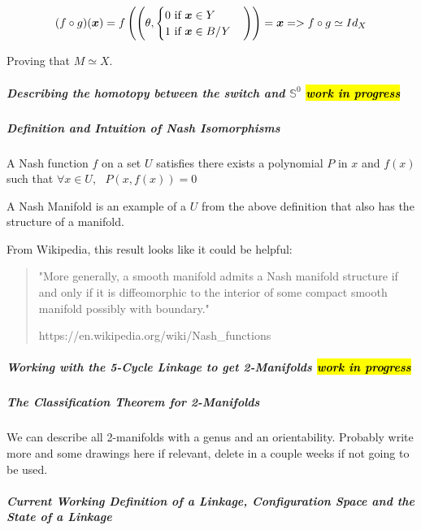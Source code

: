 \documentclass[
]{article}
\begin{document}
\[(f \circ g)(\boldsymbol x) = f \left( \left(\theta, 
\begin{cases}
0 \text{ if } \boldsymbol x \in Y
\\
1 \text{ if } \boldsymbol x \in B/Y
\end{cases} \right) \right)
=
\boldsymbol x
\\
=> f \circ g \simeq Id_X\]

Proving that \(M \simeq X\).

\hypertarget{header-n78}{%
\subparagraph{\texorpdfstring{\emph{Describing the homotopy between the
switch and \(\mathbb S^0 \) \hl{work in
progress}}}{Describing the homotopy between the switch and \textbackslash mathbb S\^{}0  work in progress}}\label{header-n78}}

\hypertarget{header-n79}{%
\subparagraph{\texorpdfstring{\emph{Definition and Intuition of Nash
Isomorphisms}
}{Definition and Intuition of Nash Isomorphisms }}\label{header-n79}}

A Nash function \(f\) on a set \(U\) satisfies there exists a polynomial
\(P\) in \(x\) and \(f(x)\) such that
\(\forall x \in U, \,\,\,\, P(x,f(x)) = 0\)

A Nash Manifold is an example of a \(U\) from the above definition that
also has the structure of a manifold.

From Wikipedia, this result looks like it could be helpful:

\begin{quote}
"More generally, a smooth manifold admits a Nash manifold structure if
and only if it is diffeomorphic to the interior of some compact smooth
manifold possibly with boundary."

https://en.wikipedia.org/wiki/Nash\_functions
\end{quote}

\hypertarget{header-n86}{%
\subparagraph{\texorpdfstring{\emph{Working with the 5-Cycle Linkage to
get 2-Manifolds} \hl{work in
progress}}{Working with the 5-Cycle Linkage to get 2-Manifolds work in progress}}\label{header-n86}}

\hypertarget{header-n87}{%
\subparagraph{\texorpdfstring{\emph{The Classification Theorem for
2-Manifolds}}{The Classification Theorem for 2-Manifolds}}\label{header-n87}}

We can describe all 2-manifolds with a genus and an orientability.
Probably write more and some drawings here if relevant, delete in a
couple weeks if not going to be used.

\hypertarget{header-n89}{%
\subparagraph{\texorpdfstring{\emph{Current Working Definition of a
Linkage, Configuration Space and the State of a
Linkage}}{Current Working Definition of a Linkage, Configuration Space and the State of a Linkage}}\label{header-n89}}
\end{document}
